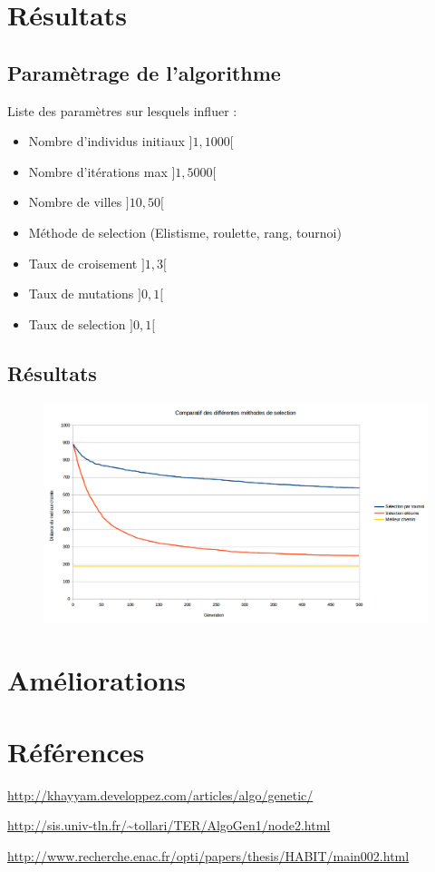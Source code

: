 \documentclass{article}
\begin{document}
\section{Résultats}
	\subsection{Paramètrage de l'algorithme}

	Liste des paramètres sur lesquels influer :
	\begin{itemize}
	\item Nombre d'individus initiaux $]1,1000[$
	\item Nombre d'itérations max $]1,5000[$
	\item Nombre de villes $]10,50[$
	\item Méthode de selection (Elistisme, roulette, rang, tournoi)
	\item Taux de croisement $]1,3[$
	\item Taux de mutations $]0,1[$
	\item Taux de selection $]0,1[$
	\end{itemize}

	\subsection{Résultats}

	\begin{figure}
		\begin{center}
			\includegraphics[scale=0.4]{comparatif.png}
		\end{center}
	\end{figure}

\section{Améliorations}


\section{Références}
	\url{http://khayyam.developpez.com/articles/algo/genetic/}

	\url{http://sis.univ-tln.fr/~tollari/TER/AlgoGen1/node2.html}

	\url{http://www.recherche.enac.fr/opti/papers/thesis/HABIT/main002.html}
\end{document}
